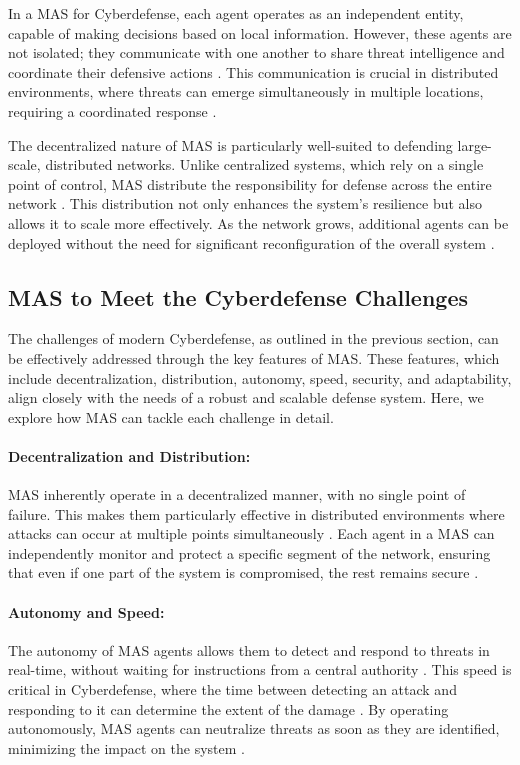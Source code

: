In a MAS for Cyberdefense, each agent operates as an independent entity, capable of making decisions based on local information. However, these agents are not isolated; they communicate with one another to share threat intelligence and coordinate their defensive actions \cite{kolias2016swarm}. This communication is crucial in distributed environments, where threats can emerge simultaneously in multiple locations, requiring a coordinated response \cite{bace2001intrusion}.

The decentralized nature of MAS is particularly well-suited to defending large-scale, distributed networks. Unlike centralized systems, which rely on a single point of control, MAS distribute the responsibility for defense across the entire network \cite{shamshirband2014cooperative}. This distribution not only enhances the system's resilience but also allows it to scale more effectively. As the network grows, additional agents can be deployed without the need for significant reconfiguration of the overall system \cite{shamshirband2018computational}.

\subsection{MAS to Meet the Cyberdefense Challenges}

The challenges of modern Cyberdefense, as outlined in the previous section, can be effectively addressed through the key features of MAS. These features, which include decentralization, distribution, autonomy, speed, security, and adaptability, align closely with the needs of a robust and scalable defense system. Here, we explore how MAS can tackle each challenge in detail.

\paragraph{Decentralization and Distribution:}
MAS inherently operate in a decentralized manner, with no single point of failure. This makes them particularly effective in distributed environments where attacks can occur at multiple points simultaneously \cite{kolias2016swarm}. Each agent in a MAS can independently monitor and protect a specific segment of the network, ensuring that even if one part of the system is compromised, the rest remains secure \cite{shakarian2015cyber}.

\paragraph{Autonomy and Speed:}
The autonomy of MAS agents allows them to detect and respond to threats in real-time, without waiting for instructions from a central authority \cite{shamshirband2014cooperative}. This speed is critical in Cyberdefense, where the time between detecting an attack and responding to it can determine the extent of the damage \cite{liao2013intrusion}. By operating autonomously, MAS agents can neutralize threats as soon as they are identified, minimizing the impact on the system \cite{shamshirband2018computational}.

